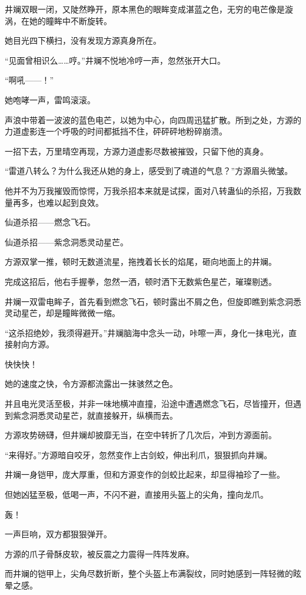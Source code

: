 \begin{this_body}
井斓双眼一闭，又陡然睁开，原本黑色的眼眸变成湛蓝之色，无穷的电芒像是漩涡，在她的瞳眸中不断旋转。

她目光四下横扫，没有发现方源真身所在。

“见面曾相识么……哼。”井斓不悦地冷哼一声，忽然张开大口。

“啊吼——！”

她咆哮一声，雷鸣滚滚。

声浪中带着一波波的蓝色电芒，以她为中心，向四周迅猛扩散。所到之处，方源的力道虚影连一个呼吸的时间都抵挡不住，砰砰砰地粉碎崩溃。

一招下去，万里晴空再现，方源力道虚影尽数被摧毁，只留下他的真身。

“雷道八转么？为什么我还从她的身上，感受到了魂道的气息？”方源眉头微皱。

他并不为万我摧毁而惊愕，万我杀招本来就是试探，面对八转蛊仙的杀招，万我数量再多，也难以起到良效。

仙道杀招——燃念飞石。

仙道杀招——紫念洞悉灵动星芒。

方源双掌一推，顿时无数道流星，拖拽着长长的焰尾，砸向地面上的井斓。

完成这招后，他右手握拳，忽然一洒，顿时洒下无数紫色星芒，璀璨剔透。

井斓一双雷电眸子，首先看到燃念飞石，顿时露出不屑之色，但旋即瞧到紫念洞悉灵动星芒，却是瞳眸微微一缩。

“这杀招绝妙，我须得避开。”井斓脑海中念头一动，咔嚓一声，身化一抹电光，直接射向方源。

快快快！

她的速度之快，令方源都流露出一抹骇然之色。

并且电光灵活至极，并非一味地横冲直撞，沿途中遭遇燃念飞石，尽皆撞开，但遇到紫念洞悉灵动星芒，就直接躲开，纵横而去。

方源攻势磅礴，但井斓却披靡无当，在空中转折了几次后，冲到方源面前。

“来得好。”方源暗自咬牙，忽然变作上古剑蛟，伸出利爪，狠狠抓向井斓。

井斓一身铠甲，庞大厚重，但和方源变作的剑蛟比起来，却显得袖珍了一些。

但她凶猛至极，低喝一声，不闪不避，直接用头盔上的尖角，撞向龙爪。

轰！

一声巨响，双方都狠狠弹开。

方源的爪子骨酥皮软，被反震之力震得一阵阵发麻。

而井斓的铠甲上，尖角尽数折断，整个头盔上布满裂纹，同时她感到一阵轻微的眩晕之感。


\end{this_body}
